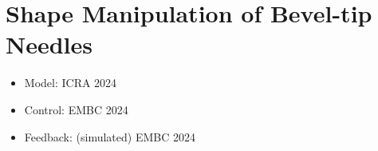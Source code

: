 \chapter{Shape Manipulation of Bevel-tip Needles} \label{chap:chap-4}
\begin{itemize}
\item Model: ICRA 2024
\item Control: EMBC 2024
\item Feedback: (simulated) EMBC 2024
\end{itemize}

